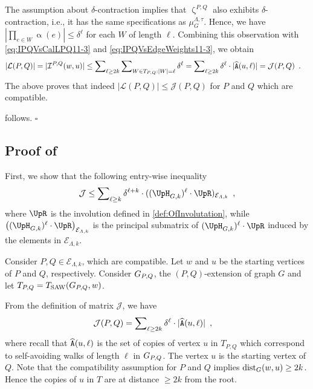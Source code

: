 \documentclass[11pt,reqno]{amsart}
\numberwithin{equation}{section}
\newcommand{\cE}{{\mathcal{E}}}
\newcommand{\cI}{{\mathcal{I}}}
\newcommand{\cL}{{\mathcal{L}}}
\newcommand{\applegreen}[1]{ {\color{applegreen}#1}}
\newcommand{\amethyst}[1]{{\color{amethyst}#1} }
\newcommand{\blue}[1]{{\color{blue}#1}}
\newcommand{\bluepigment}[1]{{\color{blue(pigment)}#1}}
\newcommand{\cadmiumgreen}[1]{{\color{cadmiumgreen}#1}}
\newcommand{\goldenbrown}[1]{{\color{goldenbrown}#1}}
\newcommand{\iris}[1]{{\color{iris}#1}}
\newcommand{\red}[1]{{\color{red}#1}}
\newcommand{\rosegold}[1]{{\color{rosegold}#1}}
\newcommand{\dist}{{\rm dist}}
\newcommand{\ExtV}{\iris{\cE}}
\newcommand{\Tsaw}{T_{\rm SAW}}
\newcommand{\scp}{\widehat{\tt A}}
\newcommand{\infmatrix}{\cI}
\newcommand{\abs}[1]{\blue{|}#1\blue{|}}
\newcommand{\NBMatrix}{\cadmiumgreen{\UpH}_{G,\kk}}
\newcommand{\Invol}{\UpR}
\renewcommand{\applegreen}[1]{#1}
\renewcommand{\amethyst}[1]{#1}
\renewcommand{\blue}[1]{#1}
\renewcommand{\bluepigment}[1]{#1}
\renewcommand{\cadmiumgreen}[1]{#1}
\renewcommand{\goldenbrown}[1]{#1}
\renewcommand{\iris}[1]{#1}
\renewcommand{\red}[1]{#1}
\renewcommand{\rosegold}[1]{#1}
\newcommand{\ke}{\blue{e}}
\newcommand{\kk}{\bluepigment{k}}
\newcommand{\kell}{{\color{green(pigment)}\ell}}%
\newcommand{\kP}{\goldenbrown{P}}
\newcommand{\kQ}{\amethyst{Q}}
\newcommand{\ku}{\red{u}}
\newcommand{\kW}{\blue{W}}
\newcommand{\kw}{\blue{w}}
\renewcommand{\ke}{e}
\renewcommand{\kk}{k}
\renewcommand{\kell}{\ell}
\renewcommand{\kP}{P}
\renewcommand{\kQ}{Q}
\renewcommand{\ku}{u}
\renewcommand{\kW}{W}
\renewcommand{\kw}{w}
\newcommand{\infmatrixB}{\mathcal{J}}
\newcommand{\ExtdInfMatrix}{\rosegold{\cL}}
\newcommand{\infweight}{\upalpha}
\begin{document}
The assumption about $\delta$-contraction implies that $\upzeta^{\kP,\kQ}$ also exhibits $\delta$-contraction, i.e., 
 it has the same specifications as $\mu^{\Lambda,\tau}_G$. Hence, we have 
%
$\abs{ \prod\nolimits_{\ke\in \kW } \infweight(\ke) } \leq \delta^{\kell}$
for each $\kW$ of length $\kell$.
%
Combining this observation with \eqref{eq:IPQVsCalLPQ11-3} and \eqref{eq:IPQVsEdgeWeights11-3}, we obtain 
\begin{align}\nonumber
\abs{\ExtdInfMatrix(\kP, \kQ)}=\abs{\infmatrix^{\kP,\kQ}(\kw,\ku)}&\leq \sum\nolimits_{\kell\geq 2\kk}\sum\nolimits_{\kW\in T_{\kP,\kQ} : \abs{\kW}=\kell} \delta^{\kell}
=\sum\nolimits_{\kell\geq 2\kk} \delta^{\kell} \cdot \abs{\scp(\ku,\kell)} = \infmatrixB(\kP,\kQ) \enspace.
\end{align}
The above proves that indeed $\abs{\ExtdInfMatrix(\kP,\kQ)} \leq \infmatrixB(\kP,\kQ)$ for $\kP$ and $\kQ$ which are compatible. 

 follows.  \hfill $\square$




\subsection{Proof of }\label{sec:prop:CJVskNBM}
First, we show that the following entry-wise inequality
\begin{align}\label{eq:Final4prop:CJVskNBM}
\infmatrixB \leq \sum\nolimits_{\kell\geq \kk}\delta^{\kell+\kk}\cdot  ( ( \NBMatrix )^{\kell}\cdot \Invol )_{\ExtV_{\Lambda,\kk}}\enspace,
\end{align}
%
where $\Invol$ is the involution defined in \eqref{def:OfInvolutation}, while $\left( ( \NBMatrix )^{\kell}\cdot \Invol \right)_{\ExtV_{\Lambda,k}}$ is the principal submatrix of $( \NBMatrix )^{\kell}\cdot \Invol$
 induced by the elements in $\ExtV_{\Lambda,k}$. 
 





%
Consider $\kP,\kQ\in \ExtV_{\Lambda,k}$, which are compatible. Let $\kw$ and $\ku$
be the starting vertices of $\kP$ and $\kQ$, respectively. 
%
Consider $\gext{G}{\kP,\kQ}$, the $(\kP,\kQ)$-extension of graph $G$ and let $T_{\kP,\kQ}=\Tsaw(\gext{G}{\kP,\kQ},\kw)$.


From the definition of matrix $\infmatrixB$, we have
\begin{align}\label{eq:RedefInfmatrixBP-Q}
\infmatrixB(\kP,\kQ)&=\sum\nolimits_{\kell\geq 2\kk}\delta^{\kell}\cdot \abs{\scp(\ku,\kell)} \enspace,
\end{align}
where recall that $\scp(\ku,\kell)$ is the set of copies of vertex $\ku$ in $T_{\kP,\kQ}$ which correspond to 
self-avoiding walks of length $\kell$ in $\gext{G}{\kP,\kQ}$.  
%
The vertex $\ku$ is the starting vertex of $\kQ$. Note that the compatibility assumption for $\kP$  and $\kQ$ implies 
$\dist_{G}(\kw,\ku)\geq 2\kk$. Hence the  copies of $\ku$ in $T$ are at distance $\geq 2\kk$ from the root. 
\end{document}
